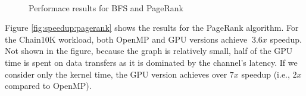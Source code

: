 \begin{figure}[htbp]
\begin{center}
\mbox{
}
\caption{Performace results for BFS and PageRank}
\label{fig:speedup}
\end{center}
\end{figure}

Figure \ref{fig:speedup:pagerank} shows the results for the PageRank algorithm. For the Chain10K workload, both OpenMP and GPU versions achieve $~3.6x$ speedup. Not shown in the figure, because the graph is relatively small, half of the GPU time is spent on data transfers as it is dominated by the channel's latency. If we consider only the kernel time, the GPU version achieves over $7x$ speedup (i.e., $2x$ compared to OpenMP).


